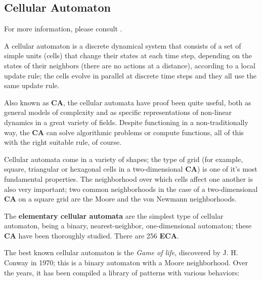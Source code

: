
\subsection{Cellular Automaton}
\label{sec:brief_summary:cellular_automaton}

For more information, please consult \cite{cellular-automata-sep,
cellular-automata-kari, cellular-automata-math, j1, j2, j3}.

A cellular automaton is a discrete dynamical system that consists of a set of
simple units (cells) that change their states at each time step, depending on
the states of their neighbors (there are no actions at a distance), according to
a local update rule; the cells evolve in parallel at discrete time steps and
they all use the same update rule.

Also known as \textbf{CA}, the cellular automata have proof been quite useful,
both as general models of complexity and as specific representations of
non-linear dynamics in a great variety of fields. Despite functioning in a
non-traditionally way, the \textbf{CA} can solve algorithmic problems or
compute functions, all of this with the right suitable rule, of course.

Cellular automata come in a variety of shapes; the type of grid (for example,
square,  triangular or hexagonal cells in a two-dimensional \textbf{CA}) is one
of it's most fundamental properties. The neighborhood over which cells affect
one another is also very important; two common neighborhoods in the case of a
two-dimensional \textbf{CA} on a square grid are the Moore and the von Newmann
neighborhoods.

The \textbf{elementary cellular automata} are the simplest type of cellular
automaton, being a binary, nearest-neighbor, one-dimensional automaton; these
\textbf{CA} have been thoroughly studied. There are 256 \textbf{ECA}.

The best known cellular automaton is the \textit{Game of life}, discovered by
J. H. Conway in 1970; this is a binary automaton with a Moore neighborhood. Over
the years, it has been compiled a library of patterns with various behaviors:

